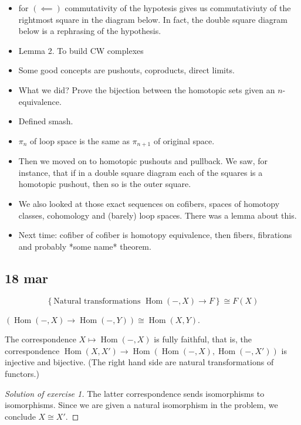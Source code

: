 \documentclass{article}
\numberwithin{equation}{section}
\DeclareMathOperator{\Hom}{Hom}
\begin{document}
\begin{itemize}
	\item for $(\impliedby)$ commutativity of the hypotesis gives us commutativiuty of the rightmost square in the diagram below. In fact, the double square diagram below is a rephrasing of the hypothesis.
	
	\item Lemma 2. To build CW complexes
	
	\item {\color{cyan} Some good concepts are pushouts, coproducts, direct limits.}
	\item What we did? Prove the bijection between the homotopic sets given an $n$-equivalence.
	\item Defined smash.
	\item $\pi_n$ of loop space is the same as $\pi_{n+1}$ of original space.
	\item Then we moved on to homotopic pushouts and pullback. We saw, for instance, that if in a double square diagram each of the squares is a homotopic pushout, then so is the outer square.
	\item We also looked at those exact sequences on cofibers, spaces of homotopy classes, cohomology and (barely) loop spaces. There was a lemma about this.
	\item Next time: cofiber of cofiber is homotopy equivalence, then fibers, fibrations and probably *some name* theorem.
\end{itemize}

\subsection{18 mar}

\begin{lemma}[Yoneda]	
	\[\left\{\text{Natural transformations }\Hom(-,X)\to F\right\}\cong F(X)\]
\end{lemma}
\begin{coro}
	$(\Hom(-,X)\to\Hom(-,Y))\cong\Hom(X,Y)$.
\end{coro}
\begin{coro}
	The correspondence $X\mapsto\Hom(-,X)$ is fully faithful, that is, the correspondence $\Hom(X,X')\to\Hom(\Hom(-,X),\Hom(-,X'))$ is injective and bijective. (The right hand side are natural transformations of functors.)
\end{coro}
\begin{proof}[Solution of exercise 1] The latter correspondence sends isomorphisms to isomorphisms. Since we are given a natural isomorphism in the problem, we conclude $X\cong X'$.
\end{proof}
\end{document}
